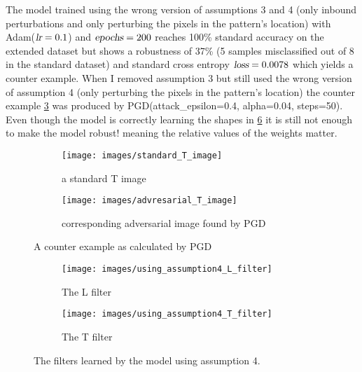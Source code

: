 \documentclass[../thesis.tex]{subfiles}
\begin{document}
	 
	
	The model trained using the wrong version of assumptions 3 and 4 (only inbound perturbations and only perturbing the pixels in the pattern's location) with Adam($\variablename{lr} = 0.1$) and $\variablename{epochs} = 200$ reaches 100\% standard accuracy on the extended dataset but shows a robustness of 37\% (5 samples misclassified out of 8 in the standard dataset) and standard cross entropy $\variablename{loss} = 0.0078$ which yields a counter example. When I removed assumption 3 but still used the wrong version of assumption 4 (only perturbing the pixels in the pattern's location) the counter example \ref{fig:pgd_counterexample} was produced by PGD(attack\_epsilon=0.4, alpha=0.04, steps=50). Even though the model is correctly learning the shapes in \ref{fig:assumption4_model} it is still not enough to make the model robust! meaning the relative values of the weights matter.
	
	
	\begin{figure}
		\centering
		\begin{subfigure}{.5\textwidth}
			\centering
			\texttt{[image: images/standard\_T\_image]}
			\caption{a standard T image}
			\label{fig:standardtimage}
		\end{subfigure}%
		\begin{subfigure}{.5\textwidth}
			\centering
			\texttt{[image: images/advresarial\_T\_image]}
			\caption{corresponding adversarial image found by PGD}
			\label{fig:advresarialtimage}
		\end{subfigure}
		\caption{A counter example as calculated by PGD}
		\label{fig:pgd_counterexample}
	\end{figure}


	\begin{figure}
		\centering
		\begin{subfigure}{.5\textwidth}
			\centering
			\texttt{[image: images/using\_assumption4\_L\_filter]}
			\caption{The L filter}
			\label{fig:usingassumption4lfilter}
		\end{subfigure}%
		\begin{subfigure}{.5\textwidth}
			\centering
			\texttt{[image: images/using\_assumption4\_T\_filter]}
			\caption{The T filter}
			\label{fig:usingassumption4tfilter}
		\end{subfigure}
		\caption{The filters learned by the model using assumption 4.}
		\label{fig:assumption4_model}
	\end{figure}
\end{document}
